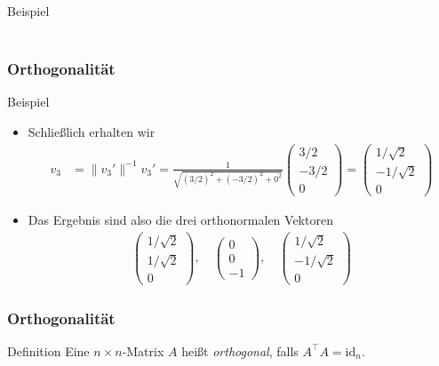 \documentclass{beamer}
\renewcommand{\emph}[1]{{\textcolor{solarizedRed}{\itshape #1}}}
\newcommand{\id}{\mathrm{id}}
\newcommand{\trans}{\top}
\renewcommand{\ae}{\"a}
\newcommand{\mytitle}{Orthogonalit\ae t}
\begin{document}
\begin{frame}
\begin{block}{Beispiel}
\begin{itemize}
\begin{align*}
				\end{align*}
		\end{itemize}
	\end{block}
\end{frame}

\begin{frame}\frametitle{\mytitle}
	\begin{block}{Beispiel}
		\begin{itemize}
			\item Schlie\ss lich erhalten wir
				\begin{align*}
					v_3&=\|v_3'\|^{-1}v_3'=\frac{1}{\sqrt{(3/2)^2+(-3/2)^2+0^2}}\begin{pmatrix}3/2\\-3/2\\0\end{pmatrix}=\begin{pmatrix}1/\sqrt 2\\-1/\sqrt 2\\0\end{pmatrix}
				\end{align*}
			\item Das Ergebnis sind also die drei orthonormalen Vektoren
				\begin{align*}
					\begin{pmatrix}1/\sqrt 2\\1/\sqrt 2\\0\end{pmatrix},\quad\begin{pmatrix}0\\0\\-1\end{pmatrix},\quad\begin{pmatrix}1/\sqrt 2\\-1/\sqrt 2\\0\end{pmatrix}
				\end{align*}
		\end{itemize}
	\end{block}
\end{frame}

\begin{frame}\frametitle{\mytitle}
	\begin{block}{Definition}
		Eine $n\times n$-Matrix $A$ hei\ss t \emph{orthogonal}, falls $A^\trans A=\id_n.$
	\end{block}
\end{frame}
\end{document}
